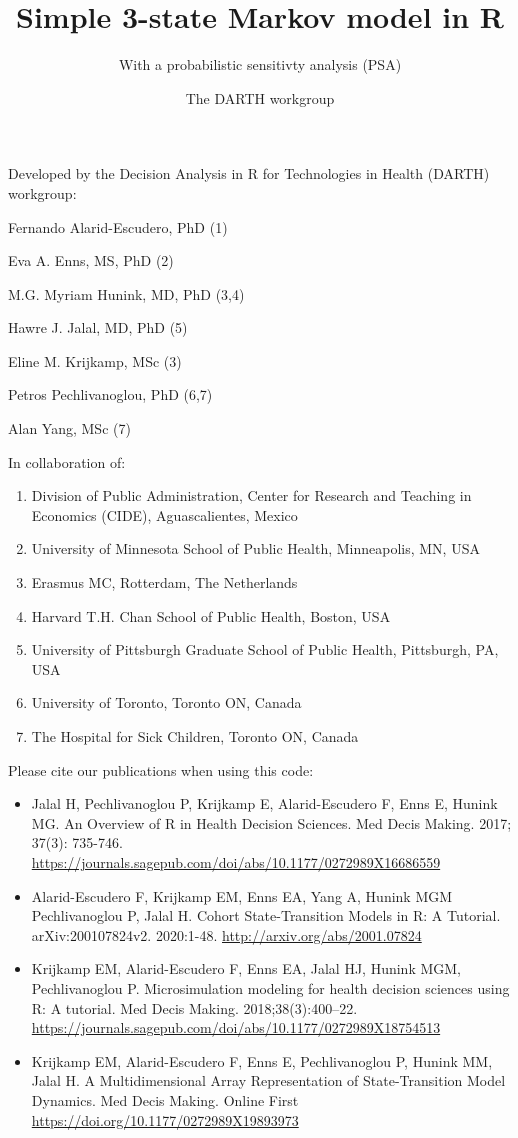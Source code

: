 \documentclass[
]{article}
\title{Simple 3-state Markov model in R}
\subtitle{With a probabilistic sensitivty analysis (PSA)}
\author{The DARTH workgroup}
\date{}
\providecommand{\tightlist}{%
  \setlength{\itemsep}{0pt}\setlength{\parskip}{0pt}}
\begin{document}
\maketitle

Developed by the Decision Analysis in R for Technologies in Health
(DARTH) workgroup:

Fernando Alarid-Escudero, PhD (1)

Eva A. Enns, MS, PhD (2)

M.G. Myriam Hunink, MD, PhD (3,4)

Hawre J. Jalal, MD, PhD (5)

Eline M. Krijkamp, MSc (3)

Petros Pechlivanoglou, PhD (6,7)

Alan Yang, MSc (7)

In collaboration of:

\begin{enumerate}
\def\labelenumi{\arabic{enumi}.}
\tightlist
\item
  Division of Public Administration, Center for Research and Teaching in
  Economics (CIDE), Aguascalientes, Mexico
\item
  University of Minnesota School of Public Health, Minneapolis, MN, USA
\item
  Erasmus MC, Rotterdam, The Netherlands
\item
  Harvard T.H. Chan School of Public Health, Boston, USA
\item
  University of Pittsburgh Graduate School of Public Health, Pittsburgh,
  PA, USA
\item
  University of Toronto, Toronto ON, Canada
\item
  The Hospital for Sick Children, Toronto ON, Canada
\end{enumerate}

Please cite our publications when using this code:

\begin{itemize}
\item
  Jalal H, Pechlivanoglou P, Krijkamp E, Alarid-Escudero F, Enns E,
  Hunink MG. An Overview of R in Health Decision Sciences. Med Decis
  Making. 2017; 37(3): 735-746.
  \url{https://journals.sagepub.com/doi/abs/10.1177/0272989X16686559}
\item
  Alarid-Escudero F, Krijkamp EM, Enns EA, Yang A, Hunink MGM
  Pechlivanoglou P, Jalal H. Cohort State-Transition Models in R: A
  Tutorial. arXiv:200107824v2. 2020:1-48.
  \url{http://arxiv.org/abs/2001.07824}
\item
  Krijkamp EM, Alarid-Escudero F, Enns EA, Jalal HJ, Hunink MGM,
  Pechlivanoglou P. Microsimulation modeling for health decision
  sciences using R: A tutorial. Med Decis Making. 2018;38(3):400--22.
  \url{https://journals.sagepub.com/doi/abs/10.1177/0272989X18754513}
\item
  Krijkamp EM, Alarid-Escudero F, Enns E, Pechlivanoglou P, Hunink MM,
  Jalal H. A Multidimensional Array Representation of State-Transition
  Model Dynamics. Med Decis Making. Online First
  \url{https://doi.org/10.1177/0272989X19893973}
\end{itemize}
\end{document}
